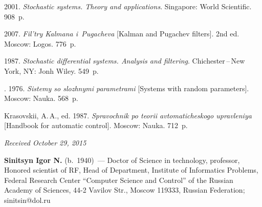 \begin{multicols}{2}
{{\begin{thebibliography}{99}
 2001.  \textit{Stochastic systems. Theory and  applications}.
Singapore: World Scientific. 908~p.

 2007. \textit{Fil'try Kalmana i~Pugacheva} [Kalman and Pugachev
filters]. 2nd ed. Moscow: Logos.  776~p.


1987. \textit{Stochastic differential systems.
Analysis and filtering}. Chichester\,--\,New York, NY: Jonh Wiley.
549~p.


. 1976.
\textit{Sistemy so slozhnymi parametrami} [Systems with random parameters]. 
Moscow: Nauka. 568~p.

Krasovskii, A.\,A., ed. 1987.
\textit{Spravochnik po teorii avtomaticheskogo upravleniya} 
[Handbook for automatic control].   Moscow: Nauka. 712~p.
\end{thebibliography}

 }
 }

\end{multicols}

\vspace*{-3pt}

\hfill{\small\textit{Received October 29, 2015}}

\Contrl

\noindent
\textbf{Sinitsyn Igor N.} (b.\ 1940)~---
Doctor of Science in technology, professor,
Honored scientist of RF, Head of Department, Institute of Informatics Problems, Federal Research Center ``Computer Science and
Control'' of the Russian Academy of Sciences, 44-2 Vavilov Str.,
Moscow 119333, Russian Federation; sinitsin@dol.ru


\label{end\stat}


\renewcommand{\bibname}{\protect\rm Литература}